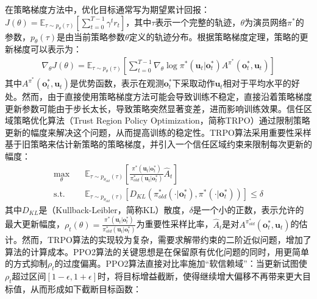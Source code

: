 在策略梯度方法中，优化目标通常写为期望累计回报：$J(\theta)=\mathbb{E}_{\tau\sim p_\theta(\tau)}\left[\sum_{t=0}^{T-1}\gamma^t r_t\right]$，其中$\tau$表示一个完整的轨迹，$\theta$为演员网络$\pi^{\ast}$的参数，$p_\theta(\tau)$是由当前策略参数$\theta$定义的轨迹分布。根据策略梯度定理\cite{sutton1999policy}，策略的更新梯度可以表示为：
\begin{equation}
\begin{aligned}
\nabla_\theta J(\theta)=\mathbb{E}_{\tau\sim p_\theta(\tau)}\left[\sum_{t=0}^{T-1}\nabla_\theta \log \pi^{\ast}(\boldsymbol{u}_t|\boldsymbol{o}^{\ast}_t) A^{\pi^{\ast}}\left(\boldsymbol{o}^{\ast}_t,\boldsymbol{u}_t\right)\right]
\end{aligned}
\label{equ:policy-gradient}
\end{equation}
其中$A^{\pi^{\ast}}(\boldsymbol{o}^{\ast}_t,\boldsymbol{u}_t)$是优势函数，表示在观测$\boldsymbol{o}^{\ast}_t$下采取动作$\boldsymbol{u}_t$相对于平均水平的好处。然而，由于直接使用策略梯度方法可能会导致训练不稳定，直接沿着策略梯度更新参数可能由于步长太长，导致策略突然显著变差，进而影响训练效果。信任区域策略优化算法\cite{schulman2015trust}（Trust Region Policy Optimization，简称TRPO）通过限制策略更新的幅度来解决这个问题，从而提高训练的稳定性。TRPO算法采用重要性采样基于旧策略来估计新策略的策略梯度，并引入一个信任区域约束来限制每次更新的幅度：
\begin{equation}
\begin{aligned}
\max_\theta \quad &\mathbb{E}_{\tau\sim p_{\theta_{old}}(\tau)}\left[\frac{\pi^\ast(\boldsymbol{u}_t|\boldsymbol{o}^{\ast}_t)}{\pi^\ast_{old}(\boldsymbol{u}_t|\boldsymbol{o}^{\ast}_t)} \hat{A}_t\right]\\
\text{s.t.}\quad & \mathbb{E}_{\tau\sim p_{\theta_{old}}(\tau)}\left[D_{KL}\left(\pi^\ast_{old}(\cdot|\boldsymbol{o}^{\ast}_t), \pi^\ast(\cdot|\boldsymbol{o}^{\ast}_t)\right)\right]\leq \delta
\end{aligned}
\label{equ:trpo}
\end{equation}
其中$D_{KL}$是（Kullback-Leibler，简称KL）散度，$\delta$是一个小的正数，表示允许的最大更新幅度，$\rho_t(\theta)=\frac{\pi^\ast(\boldsymbol{u}_t|\boldsymbol{o}^{\ast}_t)}{\pi^\ast_{old}(\boldsymbol{u}_t|\boldsymbol{o}^{\ast}_t)}$为重要性采样比率，$\hat{A}_t$是对$A^{\pi^\ast_{old}}\left(\boldsymbol{o}^{\ast}_t,\boldsymbol{u}_t\right)$的估计。然而，TRPO算法的实现较为复杂，需要求解带约束的二阶近似问题，增加了算法的计算成本。PPO2算法的关键思想是在保留原有优化问题的同时，用更简单的方式抑制$\rho_t$的过度偏离。PPO2算法直接对比率施加“软信赖域”：当更新试图使$\rho_t$超过区间$[1-\epsilon,1+\epsilon]$时，将目标增益截断，使得继续增大偏移不再带来更大目标值，从而形成如下截断目标函数：
